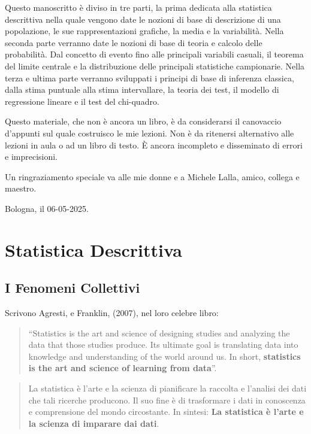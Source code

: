 \documentclass[
  11pt,
]{book}
\theoremstyle{mytheoremstyle}
\theoremstyle{mydefstyle}
\begin{document}
Questo manoscritto è diviso in tre parti, la prima dedicata alla statistica descrittiva nella quale
vengono date le nozioni di base di descrizione di una popolazione, le sue rappresentazioni grafiche,
la media e la variabilità. Nella seconda parte verranno date le nozioni di base di teoria e calcolo delle probabilità.
Dal concetto di evento fino alle principali variabili casuali, il teorema del limite centrale e la distribuzione
delle principali statistiche campionarie. Nella terza e ultima parte verranno sviluppati
i principi di base di inferenza classica, dalla stima puntuale alla stima intervallare, la teoria dei test,
il modello di regressione lineare e il test del chi-quadro.

Questo materiale, che non è ancora un libro, è da considerarsi il canovaccio d'appunti sul quale
costruisco le mie lezioni. Non è da ritenersi alternativo alle lezioni in aula o ad un libro di testo.
È ancora incompleto e disseminato di errori e imprecisioni.

Un ringraziamento speciale va alle mie donne e a Michele Lalla, amico, collega e maestro.

Bologna, il 06-05-2025.

\part{Statistica Descrittiva}

\chapter{I Fenomeni Collettivi}\label{i-fenomeni-collettivi}

Scrivono Agresti, e Franklin, (2007), nel loro celebre libro:

\begin{quote}
``Statistics is the art and science of designing studies and analyzing the data that those studies produce. Its ultimate goal is translating data into knowledge and understanding of the world around us. In short, \textbf{statistics is the art and science of learning from data}''.
\end{quote}

\begin{quote}
La statistica è l'arte e la scienza di pianificare la raccolta e l'analisi dei dati che tali ricerche producono. Il suo fine è di trasformare i dati in conoscenza e comprensione del mondo circostante. In sintesi: \textbf{La statistica è l'arte e la scienza di imparare dai dati}.
\end{quote}
\end{document}
